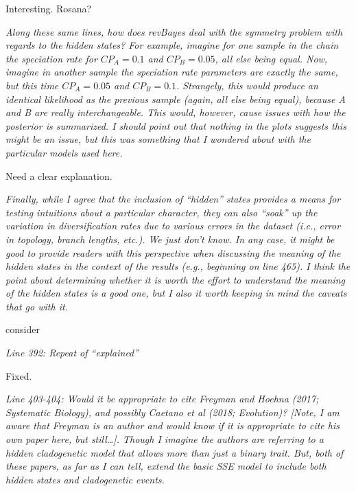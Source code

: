 \documentclass[11pt]{article}
\renewenvironment{quote}{\bigskip\noindent\itshape\ignorespaces}{\smallskip}
\begin{document}
Interesting. Rosana? %

\begin{quote}
Along these same lines, how does revBayes deal with the symmetry problem with regards to the hidden states?
For example, imagine for one sample in the chain the speciation rate for $CP_A=0.1$ and $CP_B=0.05$, all else being equal.
Now, imagine in another sample the speciation rate parameters are exactly the same, but this time $CP_A=0.05$ and $CP_B=0.1$. 
Strangely, this would produce an identical likelihood as the previous sample (again, all else being equal), because A and B are really interchangeable.
This would, however, cause issues with how the posterior is summarized.
I should point out that nothing in the plots suggests this might be an issue, but this was something that I wondered about with the particular models used here.
\end{quote}

Need a clear explanation. %

\begin{quote}
Finally, while I agree that the inclusion of ``hidden'' states provides a means for testing intuitions about a particular character, they can also ``soak'' up the variation in diversification rates due to various errors in the dataset (i.e., error in topology, branch lengths, etc.).
We just don't know.
In any case, it might be good to provide readers with this perspective when discussing the meaning of the hidden states in the context of the results (e.g., beginning on line 465).
I think the point about determining whether it is worth the effort to understand the meaning of the hidden states is a good one, but I also it worth keeping in mind the caveats that go with it.
\end{quote}

consider %


\begin{quote}
Line 392: Repeat of ``explained''
\end{quote}

Fixed.

\begin{quote}
Line 403-404: Would it be appropriate to cite Freyman and Hoehna (2017; Systematic Biology), and possibly Caetano et al (2018; Evolution)?
[Note, I am aware that Freyman is an author and would know if it is appropriate to cite his own paper here, but still\ldots]. 
Though I imagine the authors are referring to a hidden cladogenetic model that allows more than just a binary trait.
But, both of these papers, as far as I can tell, extend the basic SSE model to include both hidden states and cladogenetic events.
\end{quote}
\end{document}
